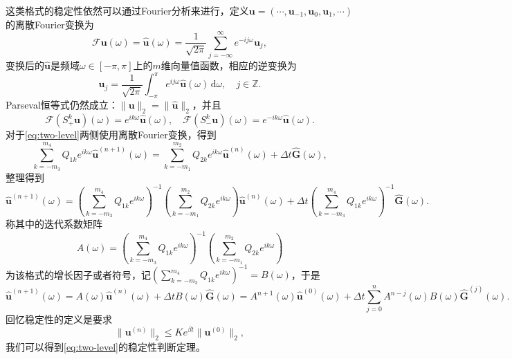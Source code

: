 \documentclass[a4paper,10pt]{ctexart}
\begin{document}
这类格式的稳定性依然可以通过Fourier分析来进行，定义$ \bm{u} = (\cdots ,\bm{u}_{-1},\bm{u}_0,\bm{u}_1,\cdots ) $的离散Fourier变换为
\begin{equation}
    \mathcal{F}\bm{u}(\omega) = \hat{\bm{u}}(\omega) = \frac{1}{\sqrt{2\pi} } \sum_{j=-\infty}^{\infty} e^{-ij\omega}\bm{u}_j,
\end{equation}
变换后的$ \hat{\bm{u}} $是频域$ \omega\in [-\pi,\pi] $上的$ m $维向量值函数，相应的逆变换为
\begin{equation}
    \bm{u}_j = \frac{1}{\sqrt{2\pi}} \int_{-\pi}^{\pi} e^{ij\omega}\hat{\bm{u}}(\omega) \, \mathrm{d}\omega,\quad j\in \mathbb{Z}.
\end{equation}
Parseval恒等式仍然成立：$ \| \bm{u} \|_2 = \| \hat{\bm{u}} \|_2 $，并且
\begin{equation}
    \mathcal{F}(S_{+}^k \bm{u})(\omega) = e^{ik \omega} \hat{\bm{u}}(\omega),\quad \mathcal{F}(S_{-}^k \bm{u})(\omega) = e^{-ik \omega} \hat{\bm{u}}(\omega).
\end{equation}
对于\eqref{eq:two-level}两侧使用离散Fourier变换，得到
\begin{equation}
    \sum_{k=-m_3}^{m_4} Q_{1k}e^{ik\omega} \hat{\bm{u}}^{(n+1)}(\omega) = \sum_{k=-m_1}^{m_2} Q_{2k}e^{ik\omega} \hat{\bm{u}}^{(n)}(\omega) + \Delta t \hat{\bm{G}}(\omega),
\end{equation}
整理得到
\begin{equation}
    \hat{\bm{u}}^{(n+1)}(\omega) = \left( \sum_{k=-m_3}^{m_4}Q_{1k}e^{ik \omega} \right)^{-1} \left( \sum_{k=-m_1}^{m_2}Q_{2k}e^{ik \omega} \right) \hat{\bm{u}}^{(n)}(\omega) + \Delta t \left( \sum_{k=-m_3}^{m_4}Q_{1k}e^{ik \omega} \right)^{-1} \hat{\bm{G}}(\omega).
\end{equation}
称其中的迭代系数矩阵
\begin{equation}
    A(\omega) = \left( \sum_{k=-m_3}^{m_4}Q_{1k}e^{ik \omega} \right)^{-1} \left( \sum_{k=-m_1}^{m_2}Q_{2k}e^{ik \omega} \right)
\end{equation}
为该格式的增长因子或者符号，记$ \left( \sum_{k=-m_3}^{m_4}Q_{1k}e^{ik \omega} \right)^{-1} = B(\omega) $，于是
\[
    \hat{\bm{u}}^{(n+1)}(\omega) = A(\omega) \hat{\bm{u}}^{(n)}(\omega) + \Delta t B(\omega) \hat{\bm{G}}(\omega) = A^{n+1}(\omega) \hat{\bm{u}}^{(0)}(\omega) + \Delta t \sum_{j=0}^{n} A^{n-j}(\omega) B(\omega)\hat{\bm{G}}^{(j)}(\omega).
\]
回忆稳定性的定义是要求
\begin{equation}
    \| \bm{u}^{(n)} \|_2 \leqslant K e^{\beta t} \| \bm{u}^{(0)} \|_2,
\end{equation}
我们可以得到\eqref{eq:two-level}的稳定性判断定理。
\end{document}
